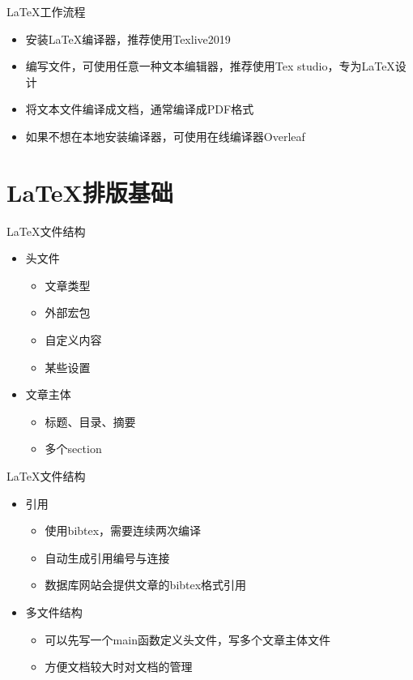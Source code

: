\documentclass[12pt,UTF8]{beamer}
\begin{document}
	\begin{frame}{\LaTeX 工作流程}
	\begin{itemize}
		\item 安装\LaTeX 编译器，推荐使用Texlive2019
		\item 编写文件，可使用任意一种文本编辑器，推荐使用Tex studio，专为\LaTeX 设计
		\item 将文本文件编译成文档，通常编译成PDF格式
		\item 如果不想在本地安装编译器，可使用在线编译器Overleaf 
	\end{itemize}
\end{frame}
\section{\LaTeX 排版基础}
	\begin{frame}{\LaTeX 文件结构}
		\begin{itemize}
			\item 头文件
			\begin{itemize}
				\item 文章类型
				\item 外部宏包
				\item 自定义内容
				\item 某些设置
			\end{itemize}
			\item 文章主体
			\begin{itemize}
				\item 标题、目录、摘要
				\item 多个section
			\end{itemize}
		\end{itemize}
	\end{frame}
	
	\begin{frame}{\LaTeX 文件结构}		
		\begin{itemize}
			\item 引用
			\begin{itemize}
				\item 使用bibtex，需要连续两次编译
				\item 自动生成引用编号与连接
				\item 数据库网站会提供文章的bibtex格式引用
			\end{itemize}
			\item 多文件结构
			\begin{itemize}
				\item 可以先写一个main函数定义头文件，写多个文章主体文件
				\item 方便文档较大时对文档的管理
			\end{itemize}
		\end{itemize}
		
	\end{frame}
	
\end{document}

